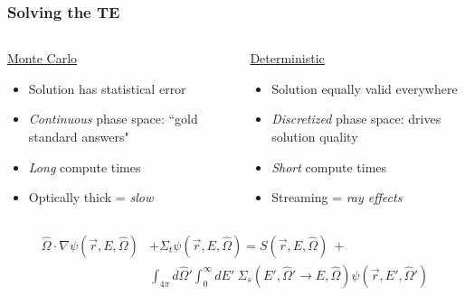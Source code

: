\documentclass[xcolor=x11names,compress]{beamer}
\renewcommand{\(}{\begin{columns}}
\renewcommand{\)}{\end{columns}}
\newcommand{\<}[1]{\begin{column}{#1}}
\renewcommand{\>}{\end{column}}
\newcommand{\vOmega}{\ensuremath{\hat{\Omega}}}
\begin{document}
\begin{frame}[fragile]
  \frametitle{Solving the TE}
%
\begin{columns}
  \begin{column}{0.5\textwidth}
  \begin{center}
  \underline{Monte Carlo}
  \end{center}
	\begin{itemize}
	\item Solution has statistical error
	\item \textit{Continuous} phase space: ``gold standard answers"
	\item\textit{ Long }compute times
	\item Optically thick = \textit{slow}
	\end{itemize}
  \end{column}
  \begin{column}{0.5\textwidth}
  \begin{center}
  \underline{Deterministic}
  \end{center}
	\begin{itemize}
	\item Solution equally valid everywhere
	\item \textit{Discretized} phase space: drives solution quality
	\item \textit{Short} compute times
	\item Streaming = \textit{ray effects}
	\end{itemize}
  \end{column}
\end{columns}

\begin{align}
\vOmega \cdot \nabla \psi(\vec{r}, E, \vOmega) &+
\Sigma_t \psi(\vec{r}, E, \vOmega) = S(\vec{r}, E, \vOmega) \:+\nonumber\\
%
& \int_{4\pi} d\vOmega' \int_0^{\infty} dE'\: \Sigma_s(E', \vOmega' \rightarrow E, \vOmega) \psi(\vec{r}, E', \vOmega') \nonumber
\end{align}

\end{frame}
\end{document}
